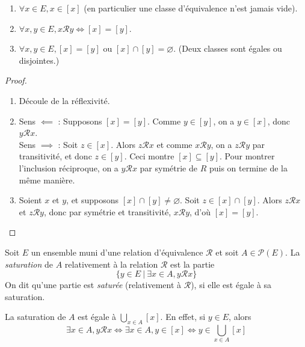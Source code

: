 \begin{proposition}
\begin{enumerate}
\item $\forall x\in E, x\in [x]$ (en particulier une classe d'équivalence n'est jamais vide).
\item $\forall x, y\in E, x{\mathcal R}y \iff [x]=[y]$.
\item $\forall x, y\in E, [x] = [y] \text{ ou } [x]\cap [y]=\varnothing$. (Deux classes sont égales ou disjointes.)
\end{enumerate}
\end{proposition}
\begin{proof}
\begin{enumerate}
\item Découle de la réflexivité.
\item Sens $\impliedby$ : Supposons $[x]=[y]$. Comme $y\in [y]$, on a $y\in [x]$, donc $y{\mathcal R}x$.\\
Sens $\implies$ : Soit $z\in [x]$. Alors $z{\mathcal R}x$ et comme $x{\mathcal R}y$, on a $z{\mathcal R}y$ par transitivité, et donc $z\in [y]$. Ceci montre $[x]\subseteq [y]$. Pour montrer l'inclusion réciproque, on a $y{\mathcal R}x$ par symétrie de $R$ puis on termine de la même manière.
\item Soient $x$ et $y$, et supposons $[x]\cap [y] \neq \varnothing$. Soit $z\in [x]\cap [y]$. Alors $z\mathcal R x$ et $z\mathcal R y$, donc par symétrie et transitivité, $x\mathcal R y$, d'où $[x]=[y]$.
\end{enumerate}
\end{proof}

\begin{definition}
Soit $E$ un ensemble muni d'une relation d'équivalence ${\mathcal R}$ et soit $A\in \mathcal P(E)$. La \emph{saturation} de $A$ relativement à la relation $\mathcal R$ est la partie
\[
\{y\in E\:|\: \exists x\in A, y\mathcal R x\} 
\]
On dit qu'une partie est \emph{saturée} (relativement à $\mathcal R$), si elle est égale à sa saturation.
\end{definition}

\begin{remarque} La saturation de $A$ est égale à $\bigcup_{x\in A} [x]$. En effet, si $y\in E$, alors 
\[
\exists x\in A, y\mathcal R x
\iff \exists x\in A, y\in [x]
\iff y\in \bigcup_{x\in A} [x]
\]
\end{remarque}

